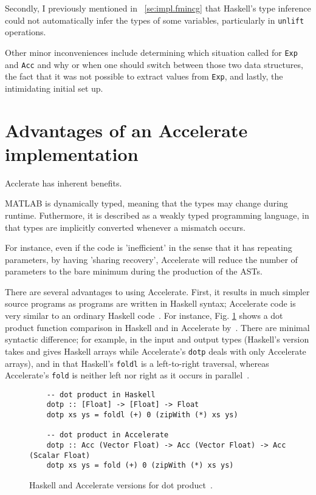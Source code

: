 Secondly, I previously mentioned in ~\ref{se:impl.fmincg} that Haskell's type inference could not automatically infer the types of some variables, particularly in \texttt{unlift} operations. 

Other minor inconveniences include determining which situation called for \texttt{Exp} and \texttt{Acc} and why or when one should switch between those two data structures, the fact that it was not possible to extract values from \texttt{Exp}, and lastly, the intimidating initial set up.

\section{Advantages of an Accelerate implementation} \label{se:eval.advantages}

Acclerate has inherent benefits.

MATLAB is dynamically typed, meaning that the types may change during runtime. Futhermore, it is described as a weakly typed programming language, in that types are implicitly converted whenever a mismatch occurs.

For instance, even if the code is 'inefficient' in the sense that it has repeating parameters, by having 'sharing recovery', Accelerate will reduce the number of parameters to the bare minimum during the production of the ASTs.

There are several advantages to using Accelerate. First, it results in much simpler source programs as programs are written in Haskell syntax; Accelerate code is very similar to an ordinary Haskell code~\cite{Mar13}. For instance, Fig. \ref{fig:dotp} shows a dot product function comparison in Haskell and in Accelerate by~\cite{McD13}. There are minimal syntactic difference; for example, in the input and output types (Haskell's version takes and gives Haskell arrays while Accelerate's \texttt{dotp} deals with only Accelerate arrays), and in that Haskell's \texttt{foldl} is a left-to-right traversal, whereas Accelerate's \texttt{fold} is neither left nor right as it occurs in parallel~\cite{McD13}.

\begin{figure}
  \begin{lstlisting}
    -- dot product in Haskell
    dotp :: [Float] -> [Float] -> Float
    dotp xs ys = foldl (+) 0 (zipWith (*) xs ys)
           
    -- dot product in Accelerate
    dotp :: Acc (Vector Float) -> Acc (Vector Float) -> Acc (Scalar Float)
    dotp xs ys = fold (+) 0 (zipWith (*) xs ys)
  \end{lstlisting}
  \caption{Haskell and Accelerate versions for dot product~\cite{McD13}.}
  \label{fig:dotp}
\end{figure}

